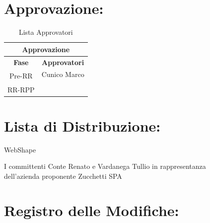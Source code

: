 \newpage
\section*{\LARGE Approvazione:}
\begin{table}[!h]
	\begin{center}
		\begin{tabular}
			{|c|c|}
			\hline
			\multicolumn{2}{|c|}{ \textbf{Approvazione} } \\
			\hline
			\textbf{Fase} & \textbf{Approvatori} \\
			\hline
			\multirow{2}{*}{Pre-RR}  &  Cunico Marco\\
									&  \\
			\hline
			\multirow{2}{*}{RR-RPP} & \\
									& \\
			\hline
		\end{tabular}
		\caption{Lista Approvatori} %
		\label{tabapprovazione}
	\end{center}
\end{table}

\textbf{}

\section*{\LARGE Lista di Distribuzione:}

	\begin{elenconumerato}{\normindent}
		\item WebShape
		\item I committenti Conte Renato e Vardanega Tullio in rappresentanza \\  dell'azienda proponente Zucchetti SPA
	\end{elenconumerato}


\section*{\LARGE Registro delle Modifiche:}


